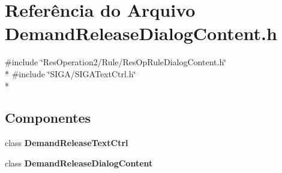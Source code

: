 \section{Referência do Arquivo Demand\+Release\+Dialog\+Content.\+h}
\label{_demand_release_dialog_content_8h}
{\ttfamily \#include \char`\"{}Res\+Operation2/\+Rule/\+Res\+Op\+Rule\+Dialog\+Content.\+h\char`\"{}}\\*
{\ttfamily \#include \char`\"{}S\+I\+G\+A/\+S\+I\+G\+A\+Text\+Ctrl.\+h\char`\"{}}\\*
\subsection*{Componentes}
\begin{DoxyCompactItemize}
\item 
class {\bf Demand\+Release\+Text\+Ctrl}
\item 
class {\bf Demand\+Release\+Dialog\+Content}
\end{DoxyCompactItemize}

